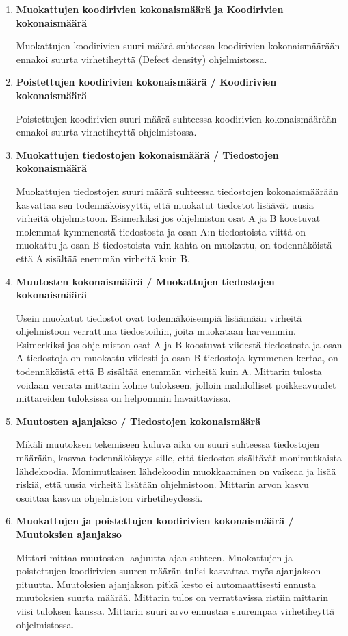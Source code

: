 \documentclass[finnish]{tktltiki2}
\theoremstyle{definition}
\theoremstyle{remark}
\begin{document}
\begin{enumerate}
    \item \textbf{Muokattujen koodirivien kokonaismäärä ja Koodirivien kokonaismäärä}

      Muokattujen koodirivien suuri määrä suhteessa koodirivien kokonaismäärään ennakoi suurta virhetiheyttä (Defect density) ohjelmistossa.
    \item \textbf{Poistettujen koodirivien kokonaismäärä / Koodirivien kokonaismäärä}

      Poistettujen koodirivien suuri määrä suhteessa koodirivien kokonaismäärään ennakoi suurta virhetiheyttä ohjelmistossa.\newpage
    \item \textbf{Muokattujen tiedostojen kokonaismäärä / Tiedostojen kokonaismäärä}

      Muokattujen tiedostojen suuri määrä suhteessa tiedostojen kokonaismäärään kasvattaa sen todennäköisyyttä, että muokatut tiedostot lisäävät uusia virheitä ohjelmistoon. Esimerkiksi jos ohjelmiston osat A ja B koostuvat molemmat kymmenestä tiedostosta ja osan A:n tiedostoista viittä on muokattu ja osan B tiedostoista vain kahta on muokattu, on todennäköistä että A sisältää enemmän virheitä kuin B.
    \item \textbf{Muutosten kokonaismäärä / Muokattujen tiedostojen kokonaismäärä}

      Usein muokatut tiedostot ovat todennäköisempiä lisäämään virheitä ohjelmistoon verrattuna tiedostoihin, joita muokataan harvemmin. Esimerkiksi jos ohjelmiston osat A ja B koostuvat viidestä tiedostosta ja osan A tiedostoja on muokattu viidesti ja osan B tiedostoja kymmenen kertaa, on todennäköistä että B sisältää enemmän virheitä kuin A. Mittarin tulosta voidaan verrata mittarin kolme tulokseen, jolloin mahdolliset poikkeavuudet mittareiden tuloksissa on helpommin havaittavissa.
    \item \textbf{Muutosten ajanjakso / Tiedostojen kokonaismäärä}

      Mikäli muutoksen tekemiseen kuluva aika on suuri suhteessa tiedostojen määrään, kasvaa todennäköisyys sille, että tiedostot sisältävät monimutkaista lähdekoodia. Monimutkaisen lähdekoodin muokkaaminen on vaikeaa ja lisää riskiä, että uusia virheitä lisätään ohjelmistoon. Mittarin arvon kasvu osoittaa kasvua ohjelmiston virhetiheydessä.
    \item \textbf{Muokattujen ja poistettujen koodirivien kokonaismäärä / Muutoksien ajanjakso}

      Mittari mittaa muutosten laajuutta ajan suhteen. Muokattujen ja poistettujen koodirivien suuren määrän tulisi kasvattaa myös ajanjakson pituutta. Muutoksien ajanjakson pitkä kesto ei automaattisesti ennusta muutoksien suurta määrää. Mittarin tulos on verrattavissa ristiin mittarin viisi tuloksen kanssa. Mittarin suuri arvo ennustaa suurempaa virhetiheyttä ohjelmistossa.


\end{enumerate}
\end{document}
